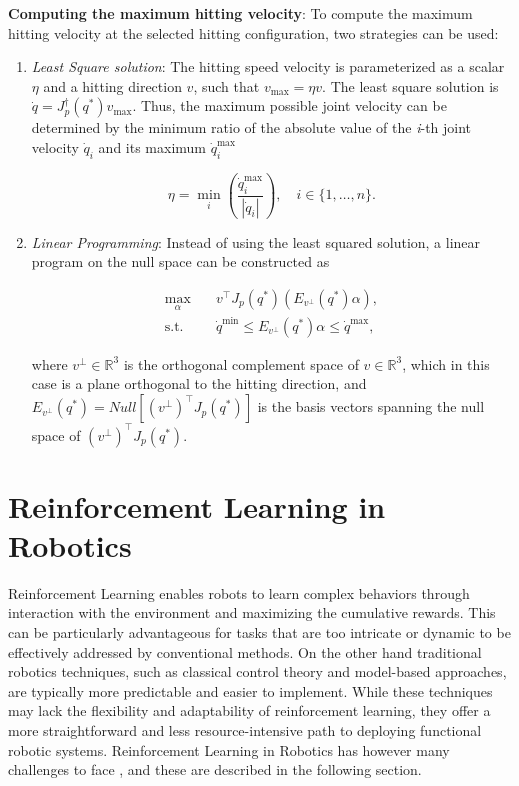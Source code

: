 \textbf{Computing the maximum hitting velocity}:
To compute the maximum hitting velocity at the selected hitting configuration, two strategies can be used:
\begin{enumerate}
    \item \textit{Least Square solution}: The hitting speed velocity is parameterized as a scalar $\eta$ and a hitting direction $v$, such that
        $v_{\max} = \eta v$. The least square solution is $\dot{q} = J_p^\dag(q^*)v_{\max}$. Thus, the maximum possible joint velocity can be determined
        by the minimum ratio of the absolute value of the \textit{i}-th joint velocity $\dot{q}_i$ and its maximum $\dot{q}^{\max}_i$

        \begin{equation*}
            \eta = \min_i \left(\frac{\dot{q}^{\max}_i}{|\dot{q}_i|}\right),\quad i \in \{1,\dots,n\}.
        \end{equation*}

    \item \textit{Linear Programming}:  Instead of using the least squared solution, a linear program on the null space can be constructed as

        \begin{equation*}
            \begin{aligned}
                \max_\alpha \quad &v^\intercal J_p(q^*)\left(E_{v^\bot}(q^*)\alpha\right), \\
                \text{s.t.} \quad & \dot{q}^{\min} \le E_{v^\bot}(q^*)\alpha \le \dot{q}^{\max},
            \end{aligned}
        \end{equation*}

        where $v^\bot \in \mathbb{R}^3$ is the orthogonal complement space of $v \in \mathbb{R}^3$, which in this case is a plane orthogonal to the hitting direction,
        and $E_{v^\bot}(q^*) = Null\left[(v^{\bot})^\intercal J_p(q^*)\right]$ is the basis vectors spanning the null space of $(v^{\bot})^\intercal J_p(q^*)$.
\end{enumerate}


\section{Reinforcement Learning in Robotics}
Reinforcement Learning enables robots to learn complex behaviors through interaction with the environment and maximizing the cumulative rewards.
This can be particularly advantageous for tasks that are too intricate or dynamic to be effectively addressed by conventional methods.
On the other hand traditional robotics techniques, such as classical control theory and model-based approaches, are typically more predictable and easier to implement.
While these techniques may lack the flexibility and adaptability of reinforcement learning, they offer a more straightforward and less resource-intensive path to deploying
functional robotic systems. Reinforcement Learning in Robotics has however many challenges to face \cite{Kober2013}, and these are described in the following section.

